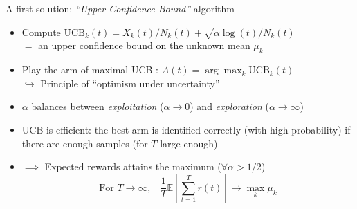 \documentclass[11pt,english,ignorenonframetext,]{beamer}
\begin{document}
\begin{frame}{A first solution: \emph{``Upper Confidence Bound''} algorithm}

  \begin{itemize}
    \item
      Compute $\mathrm{UCB}_k(t) = X_k(t) / N_k(t) + \sqrt{\alpha \log(t) / N_k(t)}$ \\
      $=$ an \alert{upper confidence bound} on the \alert{unknown} mean $\mu_k$
    \item
      Play the arm of maximal UCB : $A(t) = \arg\max_k \mathrm{UCB}_k(t)$
      \\
      $\hookrightarrow$ Principle of ``optimism under uncertainty''
    \item
      $\alpha$ balances between \emph{exploitation} ($\alpha\to0$) and \emph{exploration}  ($\alpha\to\infty$)

    \pause

    \item
      \alert{UCB is efficient}:
      the best arm is identified correctly (with high probability) if there are enough samples (for $T$ large enough)
    \item
      $\implies$
      Expected rewards attains the maximum
      ($\forall \alpha>1/2$)
      \[ \text{For~} T\to\infty, \;\;\; \frac{1}{T} \mathbb{E}\left[ \sum\limits_{t=1}^T r(t) \right] \to \max_k \mu_k \]
  \end{itemize}
\end{frame}
\end{document}

